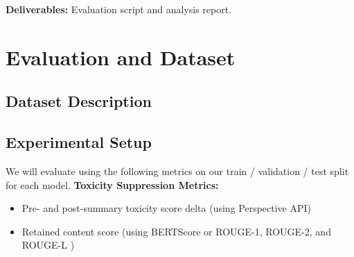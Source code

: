 \documentclass{article}
\begin{document}
\textbf{Deliverables:} Evaluation script and analysis report.

\section{Evaluation and Dataset}

\subsection{Dataset Description}



\subsection{Experimental Setup}
We will evaluate using the following metrics on our train / validation / test split for each model.
 \textbf{Toxicity Suppression Metrics:}
\begin{itemize}
    
        \item Pre- and post-summary toxicity score delta (using Perspective API) \cite{perspectiveapi}
        \item Retained content score (using BERTScore or ROUGE-1, ROUGE-2, and ROUGE-L ) \cite{barbella2022rouge}
\end{itemize}



\end{document}
